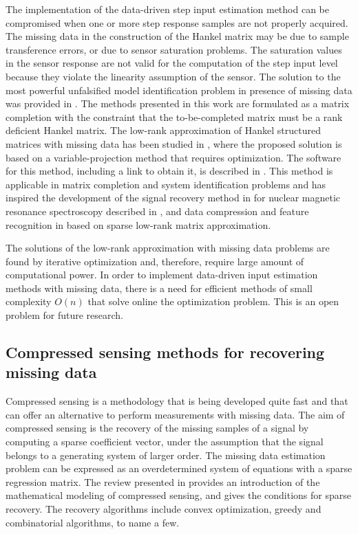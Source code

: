The implementation of the data-driven step input estimation method can be compromised when one or more step response samples are not properly acquired.
The missing data in the construction of the Hankel matrix may be due to sample transference errors, or due to sensor saturation problems.
The saturation values in the sensor response are not valid for the computation of the step input level because they violate the linearity assumption of the sensor.
The solution to the most powerful unfalsified model identification problem in presence of missing data was provided in \citet{Markovsky16}. 
The methods presented in this work are formulated as a matrix completion with the constraint that the to-be-completed matrix must be a rank deficient Hankel matrix.
The low-rank approximation of Hankel structured matrices with missing data has been studied in \citet{Markovsky13}, where the proposed solution is based on a variable-projection method that requires optimization.
The software for this method, including a link to obtain it, is described in \citet{Markovsky14}. 
This method is applicable in matrix completion and system identification problems and has inspired the development of the signal recovery method in for nuclear magnetic resonance spectroscopy described in \citet{Ying18}, and data compression and feature recognition in \citet{Hou17} based on sparse low-rank matrix approximation.

The solutions of the low-rank approximation with missing data problems are found by iterative optimization and, therefore, require large amount of computational power.
In order to implement data-driven input estimation methods with missing data, there is a need for efficient methods of small complexity $O(n)$ that solve online the optimization problem.
This is an open problem for future research. 


	
	\subsection*{Compressed sensing methods for recovering missing data}
	
	Compressed sensing is a methodology that is being developed quite fast and that can offer an alternative to perform measurements with missing data. 
	The aim of compressed sensing is the recovery of the missing samples of a signal by computing a sparse coefficient vector, under the assumption that the signal belongs to a generating system of larger order. 
	The missing data estimation problem can be expressed as an overdetermined system of equations with a sparse regression matrix. 
	The review presented in \cite{Eldar2012compressed} provides an introduction of the mathematical modeling of compressed sensing, and gives the conditions for sparse recovery. 
	The recovery algorithms include convex optimization, greedy and combinatorial algorithms, to name a few.
    
